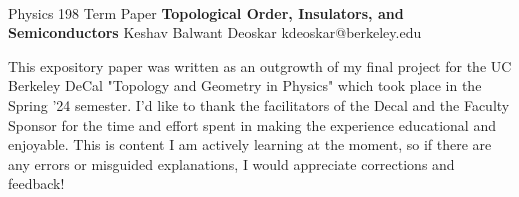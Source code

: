 \documentclass[11pt]{article}
\begin{document}
\thispagestyle{empty}
\bigskip \
\vspace{0.1cm}

\begin{center}
{\fontsize{22}{22} \selectfont Physics 198 Term Paper}
\vskip 16pt
{\fontsize{36}{36} \selectfont \bf \sffamily Topological Order, Insulators, and Semiconductors}
\vskip 24pt
{\fontsize{18}{18} \selectfont \rmfamily Keshav Balwant Deoskar} 
\vskip 6pt
{\fontsize{14}{14} \selectfont \ttfamily kdeoskar@berkeley.edu} 
\vskip 24pt
\end{center}


This expository paper was written as an outgrowth of my final project for the UC Berkeley DeCal "Topology and Geometry in Physics" which took place in the Spring '24 semester. I'd like to thank the facilitators of the Decal and the Faculty Sponsor for the time and effort spent in making the experience educational and enjoyable. This is content I am actively learning at the moment, so if there are any errors or misguided explanations, I would appreciate corrections and feedback!

\microtoc
\newpage

\end{document}
